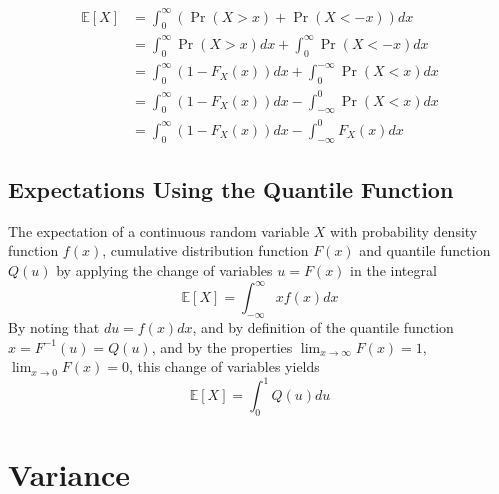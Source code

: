 \documentclass[11pt]{report} %
\begin{document}
\begin{align}
\mathbb{E}\left[X\right] &= \int_{0}^{\infty}\left(\operatorname{Pr}\left(X > x\right) + \operatorname{Pr}\left(X < -x\right)\right) dx \\
&= \int_{0}^{\infty}\operatorname{Pr}\left(X > x\right)dx + \int_{0}^{\infty}\operatorname{Pr}\left(X < -x\right) dx \\
&= \int_{0}^{\infty}\left(1 - F_{X}\left(x\right)\right) dx + \int_{0}^{-\infty}\operatorname{Pr}\left(X < x\right) dx \\
&= \int_{0}^{\infty}\left(1 - F_{X}\left(x\right)\right) dx - \int_{-\infty}^{0}\operatorname{Pr}\left(X < x\right) dx \\
&= \int_{0}^{\infty}\left(1 - F_{X}\left(x\right)\right) dx - \int_{-\infty}^{0}F_{X}\left(x\right) dx
\end{align}

\subsection{Expectations Using the Quantile Function}

The expectation of a continuous random variable $X$ with probability density function $f\left(x\right)$, cumulative distribution function $F\left(x\right)$ and quantile function $Q\left(u\right)$ by applying the change of variables $u = F\left(x\right)$ in the integral
\begin{equation}
\mathbb{E}\left[X\right] = \int_{-\infty}^{\infty}xf\left(x\right)dx
\end{equation}
By noting that $du = f\left(x\right)dx$, and by definition of the quantile function $x = F^{-1}\left(u\right) = Q\left(u\right)$, and by the properties $\lim_{x\to\infty}F\left(x\right) = 1$, $\lim_{x\to 0}F\left(x\right) = 0$, this change of variables yields
\begin{equation}
\mathbb{E}\left[X\right] = \int_{0}^{1}Q\left(u\right)du
\end{equation}

\section{Variance}
\end{document}
